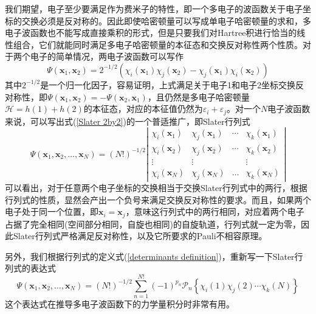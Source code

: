 \documentclass[12pt,a4paper,openany,twoside]{book}
\numberwithin{equation}{section}
\begin{document}
          我们期望，电子至少要满足作为费米子的特性，即一个多电子的波函数关于电子坐标的交换必须是反对称的。因此即使哈密顿量可以写成单电子哈密顿量的求和，多电子波函数也不能写成直接乘积的形式，但是只要我们对Hartree积进行恰当的线性组合，它们就能同时满足多电子哈密顿量的本征态和交换反对称性两个性质。对于两个电子的简单情况，两电子波函数可以写作
          \begin{equation}
            \Psi\left(\mathbf{x}_{1}, \mathbf{x}_{2}\right)=2^{-1 / 2}\left(\chi_{i}\left(\mathbf{x}_{1}\right) \chi_{j}\left(\mathbf{x}_{2}\right)-\chi_{j}\left(\mathbf{x}_{1}\right) \chi_{i}\left(\mathbf{x}_{2}\right)\right)
            \label{Slater 2by2}
          \end{equation}
          其中$2^{-1 / 2}$是一个归一化因子，容易证明，上式满足关于电子1和电子2坐标交换反对称性，即$\Psi\left(\mathbf{x}_{1}, \mathbf{x}_{2}\right) = -\Psi\left(\mathbf{x}_{2}, \mathbf{x}_{1}\right)$，且仍然是多电子哈密顿量$\mathscr{H}=h(1)+h(2)$的本征态，对应的本征值仍然为$\varepsilon_i + \varepsilon_j$。对一个$N$电子波函数来说，可以写出式(\ref{Slater 2by2})的一个普适推广，即Slater行列式
          \begin{equation}
            \Psi\left(\mathbf{x}_{1}, \mathbf{x}_{2}, \ldots, \mathbf{x}_{N}\right)=(N !)^{-1 / 2} \left| \begin{array}{cccc}{\chi_{i}\left(\mathbf{x}_{1}\right)} & {\chi_{j}\left(\mathbf{x}_{1}\right)} & {\cdots} & {\chi_{k}\left(\mathbf{x}_{1}\right)} \\ {\chi_{i}\left(\mathbf{x}_{2}\right)} & {\chi_{j}\left(\mathbf{x}_{2}\right)} & {\cdots} & {\chi_{k}\left(\mathbf{x}_{2}\right)} \\ {\vdots} & {\vdots} & { } & {\vdots} \\ {\chi_{i}\left(\mathbf{x}_{N}\right)} & {\chi_{j}\left(\mathbf{x}_{N}\right)} & {\ldots} & {\chi_{k}\left(\mathbf{x}_{N}\right)}\end{array}\right|
            \label{Slater Determinant}
          \end{equation}
          可以看出，对于任意两个电子坐标的交换相当于交换Slater行列式中的两行，根据行列式的性质，显然会产出一个负号来满足交换反对称性的要求。而且，如果两个电子处于同一个位置，即$\mathbf{x}_{i}=\mathbf{x}_{j}$，意味这行列式中的两行相同，对应着两个电子占据了完全相同(空间部分相同，自旋也相同)的自旋轨道，行列式就一定为零，因此Slater行列式严格满足反对称性，以及它所要求的Pauli不相容原理。

          另外，我们根据行列式的定义式(\ref{determinants definition})，重新写一下Slater行列式的表达式
          \begin{equation}
            \Psi\left(\mathbf{x}_{1}, \mathbf{x}_{2}, \ldots, \mathbf{x}_{N}\right)=(N !)^{-1 / 2} \sum_{n=1}^{N !}(-1)^{p_{n}} \mathscr{P}_{n}\left\{\chi_{i}(1) \chi_{j}(2) \cdots \chi_{k}(N)\right\}
          \end{equation}
          这个表达式在推导多电子波函数下的力学量积分时非常有用。
          
\end{document}
